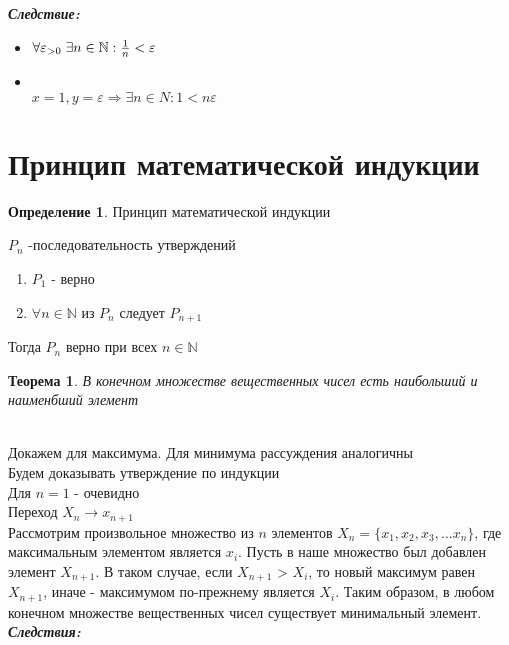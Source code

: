 \documentclass[12pt,letterpaper]{report}
\makeatletter
\newtheorem*{theorem-non}{Теорема}
\theoremstyle{definition}
\newtheorem*{conj}{Определение}
\renewenvironment{proof}[1][\proofname]{%
   \par\pushQED{\qed}\normalfont%
   \topsep6\p@\@plus6\p@\relax
   \trivlist\item[\hskip\labelsep\bfseries#1\@addpunct{.}]%
   \ignorespaces
}{%
   \popQED\endtrivlist\@endpefalse
}
\makeatother
\begin{document}
\textbf{\textit{Следствие:}}
    \begin{itemize}
        \item[] $\forall \varepsilon_{> 0} \; \exists n \in \mathbb{N}: {{1}\over{n}} < \varepsilon$
        \begin{proof}
           \quad \\ $x = 1, y = \varepsilon \Longrightarrow \exists n \in N: 1 < n\varepsilon$
        \end{proof} 
    \end{itemize}
\section{Принцип математической индукции}
\begin{conj}
    Принцип математической индукции
\end{conj}
$P_n$ -последовательность утверждений 
\begin{enumerate}
    \item $P_1$ - верно
    \item $\forall n \in \mathbb{N}$ из $P_n$ следует $P_{n+1}$
\end{enumerate}
Тогда $P_n$ верно при всех $n \in \mathbb{N}$
\begin{theorem-non}
    В конечном множестве вещественных чисел есть наибольший и наименбший элемент
\end{theorem-non}
\begin{proof}
    \quad \\
    Докажем для максимума. Для минимума рассуждения аналогичны \\
    Будем доказывать утверждение по индукции \\
    Для $n = 1$ - очевидно \\
    Переход $X_n \longrightarrow x_{n+1}$ \\
    Рассмотрим произвольное множество из $n$ элементов $X_n = \{x_1, x_2, x_3, \dots x_n\}$, где максимальным элементом 
    является $x_i$. Пусть в наше множество был добавлен элемент $X_{n+1}$. В таком случае, если $X_{n+1}$ > $X_{i}$, то новый максимум равен
    $X_{n+1}$, иначе - максимумом по-прежнему является $X_{i}$. Таким образом, в любом конечном множестве вещественных чисел существует минимальный
    элемент.     
\end{proof}
\newpage
\textbf{\textit{Следствия:}}
\end{document}
